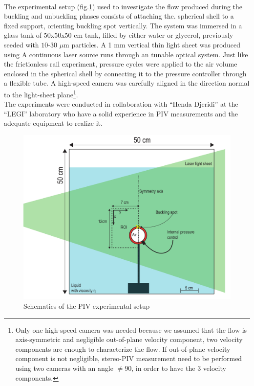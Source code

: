 \paragraph{}
The experimental setup (fig.\ref{fig:piv_schematics}) used to investigate the flow produced during the buckling and unbuckling phases consists of attaching the. 
spherical shell to a fixed support, orienting buckling spot vertically. The system was immersed in a glass tank of 50x50x50 cm tank, filled by either water or glycerol, previously seeded with $10$-$30$ $\mu$m  particles. A 1 mm vertical thin light sheet was produced using A continuous laser source runs through an tunable optical system. Just like the frictionless rail experiment, pressure cycles were applied to the air volume enclosed in the spherical shell by connecting it to the pressure controller through a flexible tube. A high-speed camera was carefully aligned in the direction normal to the light-sheet plane\footnote{Only one high-speed camera was needed because we assumed that the flow is axis-symmetric and negligible out-of-plane velocity component, two velocity components are enough to characterize the flow. If out-of-plane velocity component is not negligible, stereo-PIV measurement need to be performed using two cameras with an angle $\neq 90$\degree, in order to have the 3 velocity components.}.\\ The experiments were conducted in collaboration with "`Henda Djeridi"' at the "`LEGI"' laboratory who have a solid experience in PIV measurements and the adequate equipment to realize it.
\begin{figure}[H]%
	\centering%
	\includegraphics[width=\textwidth]{figures/Chapter_1/piv_experimental_setup.pdf}
	\caption{Schematics of the PIV experimental setup}
	\label{fig:piv_schematics}
\end{figure}

